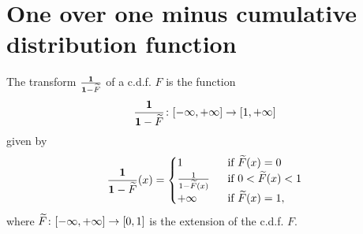 \section{One over one minus cumulative distribution function}

\begin{definition}
  \label{def:one-div-one-sub-cdf}
  \leanok
  The transform $\frac{\mathbf{1}}{\mathbf{1}-\widetilde{F}}$ of a c.d.f. $F$ is the function
  \begin{align*}
    \frac{\mathbf{1}}{\mathbf{1}-\widetilde{F}} \colon [-\infty,+\infty] \to [1,+\infty]
  \end{align*}
  given by
  \begin{align*}
    \frac{\mathbf{1}}{\mathbf{1}-\widetilde{F}}(x) = \begin{cases}
      1 & \; \text{ if } \widetilde{F}(x) = 0 \\
      \frac{1}{1-\widetilde{F}(x)} & \; \text{ if } 0 < \widetilde{F}(x) < 1 \\
      +\infty & \; \text{ if } \widetilde{F}(x) = 1 ,
      \end{cases}
  \end{align*}
  where $\widetilde{F} \colon [-\infty,+\infty] \to [0,1]$ is the extension of the c.d.f. $F$.
\end{definition}


